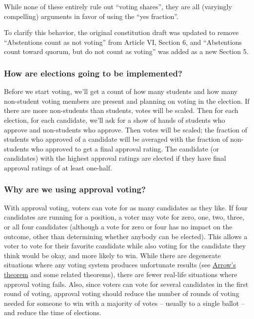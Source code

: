 \documentclass{article}
\begin{document}
While none of these entirely rule out ``voting shares'', they are all (varyingly compelling) arguments in favor of using the ``yes fraction''.

To clarify this behavior, the original constitution draft was updated to remove ``Abstentions count as not voting'' from Article VI, Section 6, and ``Abstentions count toward quorum, but do not count as voting'' was added as a new Section 5.

\subsubsection*{How are elections going to be implemented?}
Before we start voting, we'll get a count of how many students and how many non-student voting members are present and planning on voting in the election. If there are more non-students than students, votes will be scaled.  Then for each election, for each candidate, we'll ask for a show of hands of students who approve and non-students who approve. Then votes will be scaled; the fraction of students who approved of a candidate will be averaged with the fraction of non-students who approved to get a final approval rating. The candidate (or candidates) with the highest approval ratings are elected if they have final approval ratings of at least one-half.

\subsubsection*{Why are we using approval voting?}
With approval voting, voters can vote for as many candidates as they like. If four candidates are running for a position, a voter may vote for zero, one, two, three, or all four candidates (although a vote for zero or four has no impact on the outcome, other than determining whether anybody can be elected). This allows a voter to vote for their favorite candidate while also voting for the candidate they think would be okay, and more likely to win. While there are degenerate situations where any voting system produces unfortunate results (see \href{http://en.wikipedia.org/wiki/Arrow's_impossibility_theorem}{Arrow's theorem} and some related theorems), there are fewer real-life situations where approval voting fails. Also, since voters can vote for several candidates in the first round of voting, approval voting should reduce the number of rounds of voting needed for someone to win with a majority of votes -- usually to a single ballot -- and reduce the time of elections.
\end{document}
